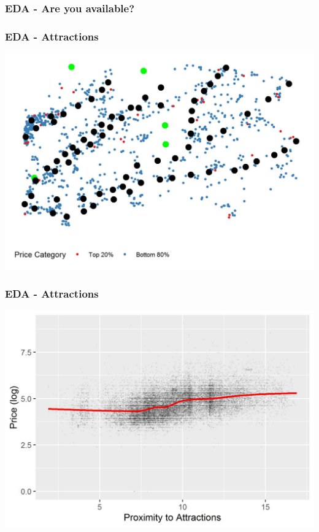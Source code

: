 \documentclass{beamer}
\begin{document}
\begin{frame}
    \frametitle{EDA - Are you available?}

    
\end{frame}

\begin{frame}
    \frametitle{EDA - Attractions}
    \includegraphics[scale = 0.8]{map_eda.jpeg}
\end{frame}

\begin{frame}
    \frametitle{EDA - Attractions}
    \includegraphics[scale = 0.8]{log_price_vs_prox_attr.jpeg}
\end{frame}
\end{document}
